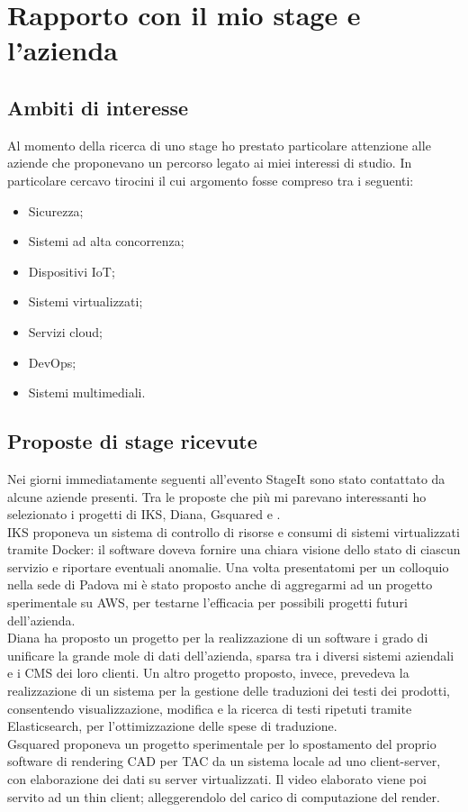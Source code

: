 \section{Rapporto con il mio stage e l'azienda}
   \subsection{Ambiti di interesse}
   Al momento della ricerca di uno stage ho prestato particolare attenzione alle aziende che proponevano un percorso legato ai miei interessi di studio. In particolare cercavo tirocini il cui argomento fosse compreso tra i seguenti:
   \begin{itemize}
      \item{Sicurezza;}
      \item{Sistemi ad alta concorrenza;}
      \item{Dispositivi IoT;}
      \item{Sistemi virtualizzati;}
      \item{Servizi cloud;}
      \item{DevOps;}
      \item{Sistemi multimediali.}
   \end{itemize}

   \subsection{Proposte di stage ricevute}
   Nei giorni immediatamente seguenti all'evento StageIt sono stato contattato da alcune aziende presenti. Tra le proposte che più mi parevano interessanti ho selezionato i progetti di IKS, Diana, Gsquared e \nomeAzienda{}.
   \\
   IKS proponeva un sistema di controllo di risorse e consumi di sistemi virtualizzati tramite \gls{Docker}: il software doveva fornire una chiara visione dello stato di ciascun servizio e riportare eventuali anomalie. Una volta presentatomi per un colloquio nella sede di Padova mi è stato proposto anche di aggregarmi ad un progetto sperimentale su \gls{AWS}, per testarne l'efficacia per possibili progetti futuri dell'azienda.
   \\
   Diana ha proposto un progetto per la realizzazione di un software i grado di unificare la grande mole di dati dell'azienda, sparsa tra i diversi sistemi aziendali e i \gls{CMS} dei loro clienti. Un altro progetto proposto, invece, prevedeva la realizzazione di un sistema per la gestione delle traduzioni dei testi dei prodotti, consentendo visualizzazione, modifica e la ricerca di testi ripetuti tramite Elasticsearch, per l'ottimizzazione delle spese di traduzione.
   \\
   Gsquared proponeva un progetto sperimentale per lo spostamento del proprio software di rendering \gls{CAD} per \gls{TAC} da un sistema locale ad uno client-server, con elaborazione dei dati su server virtualizzati. Il video elaborato viene poi servito ad un \gls{thin client}; alleggerendolo del carico di computazione del render.
   
